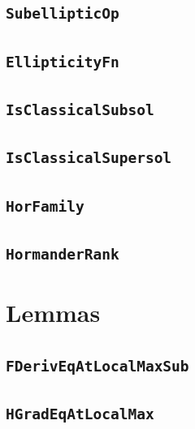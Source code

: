 \documentclass[11pt]{amsart}
\theoremstyle{definition}
\begin{document}
\subsection{\texorpdfstring{\texttt{SubellipticOp}}{SubellipticOp}}\label{node:SubellipticOp}


\subsection{\texorpdfstring{\texttt{EllipticityFn}}{EllipticityFn}}\label{node:EllipticityFn}


\subsection{\texorpdfstring{\texttt{IsClassicalSubsol}}{IsClassicalSubsol}}\label{node:IsClassicalSubsol}


\subsection{\texorpdfstring{\texttt{IsClassicalSupersol}}{IsClassicalSupersol}}\label{node:IsClassicalSupersol}


\subsection{\texorpdfstring{\texttt{HorFamily}}{HorFamily}}\label{node:HorFamily}


\subsection{\texorpdfstring{\texttt{HormanderRank}}{HormanderRank}}\label{node:HormanderRank}


\section{Lemmas}
\subsection{\texorpdfstring{\texttt{FDerivEqAtLocalMaxSub}}{FDerivEqAtLocalMaxSub}}\label{node:FDerivEqAtLocalMaxSub}


\subsection{\texorpdfstring{\texttt{HGradEqAtLocalMax}}{HGradEqAtLocalMax}}\label{node:HGradEqAtLocalMax}

\end{document}
